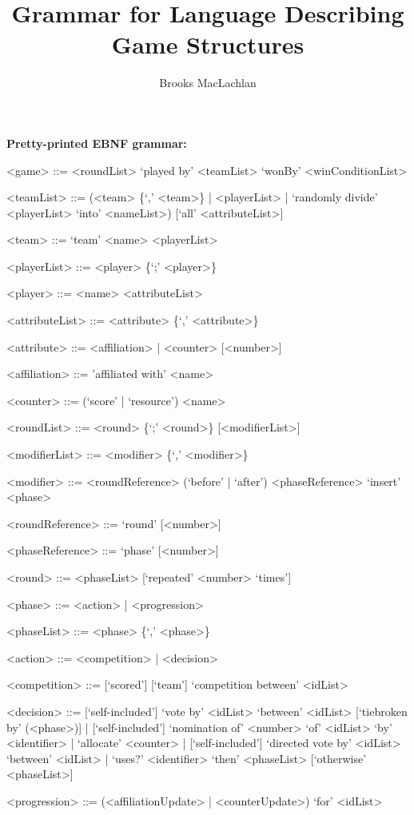 \documentclass{article}
\title{Grammar for Language Describing Game Structures}
\author{Brooks MacLachlan}
\begin{document}
\maketitle

\noindent \textbf{Pretty-printed EBNF grammar:}
\begin{grammar}
<game> ::= <roundList> `played by' <teamList> `wonBy' <winConditionList>

<teamList> ::= (<team> \{`,' <team>\} | <playerList> | `randomly divide' 
<playerList> `into' <nameList>) [`all' <attributeList>]

<team> ::= `team' <name> <playerList>

<playerList> ::= <player> \{`;' <player>\}

<player> ::= <name> <attributeList>

<attributeList> ::= <attribute> \{`,' <attribute>\}

<attribute> ::= <affiliation> | <counter> [<number>]

<affiliation> ::= 'affiliated with' <name>

<counter> ::= (`score' | `resource') <name>

<roundList> ::= <round> \{`;' <round>\} [<modifierList>]

<modifierList> ::= <modifier> \{`,' <modifier>\}

<modifier> ::= <roundReference> (`before' | `after') <phaseReference> `insert' 
<phase>

<roundReference> ::= `round' [<number>]

<phaseReference> ::= `phase' [<number>]

<round> ::= <phaseList> [`repeated' <number> `times']

<phase> ::= <action> | <progression>

<phaseList> ::= <phase> \{`,' <phase>\}

<action> ::= <competition> | <decision>

<competition> ::= [`scored'] [`team'] `competition between' <idList>

<decision> ::= [`self-included'] `vote by' <idList> `between' <idList> 
[`tiebroken by' 
(<phase>)] | [`self-included'] `nomination of' <number> 
`of' <idList> `by' <identifier> | `allocate' <counter> | [`self-included'] 
`directed vote by' <idList> `between' <idList> | `uses?' <identifier> `then' 
<phaseList> [`otherwise' <phaseList>]

<progression> ::= (<affiliationUpdate> | <counterUpdate>) 
`for' <idList>


\end{grammar}
\end{document}
